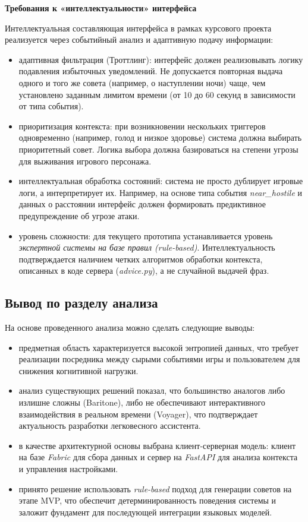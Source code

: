 \textbf{Требования к «интеллектуальности» интерфейса}

Интеллектуальная составляющая интерфейса в рамках курсового проекта реализуется через событийный анализ и адаптивную подачу информации:
\begin{itemize}
    \item адаптивная фильтрация (Троттлинг): интерфейс должен реализовывать логику подавления избыточных уведомлений. Не допускается повторная выдача одного и того же совета (например, о наступлении ночи) чаще, чем установлено заданным лимитом времени (от 10 до 60 секунд в зависимости от типа события).
    \item приоритизация контекста: при возникновении нескольких триггеров одновременно (например, голод и низкое здоровье) система должна выбирать приоритетный совет. Логика выбора должна базироваться на степени угрозы для выживания игрового персонажа.
    \item интеллектуальная обработка состояний: система не просто дублирует игровые логи, а интерпретирует их. Например, на основе типа события \textit{near\_hostile} и данных о расстоянии интерфейс должен формировать предиктивное предупреждение об угрозе атаки.
    \item уровень сложности: для текущего прототипа устанавливается уровень \textit{экспертной системы на базе правил (rule-based)}. Интеллектуальность подтверждается наличием четких алгоритмов обработки контекста, описанных в коде сервера (\textit{advice.py}), а не случайной выдачей фраз.
\end{itemize}

\subsection{Вывод по разделу анализа}

На основе проведенного анализа можно сделать следующие выводы:
\begin{itemize}
    \item предметная область характеризуется высокой энтропией данных, что требует реализации посредника между сырыми событиями игры и пользователем для снижения когнитивной нагрузки.
    \item анализ существующих решений показал, что большинство аналогов либо излишне сложны (Baritone), либо не обеспечивают интерактивного взаимодействия в реальном времени (Voyager), что подтверждает актуальность разработки легковесного ассистента.
    \item в качестве архитектурной основы выбрана клиент-серверная модель: клиент на базе \textit{Fabric} для сбора данных и сервер на \textit{FastAPI} для анализа контекста и управления настройками.
    \item принято решение использовать \textit{rule-based} подход для генерации советов на этапе MVP, что обеспечит детерминированность поведения системы и заложит фундамент для последующей интеграции языковых моделей.
\end{itemize}
